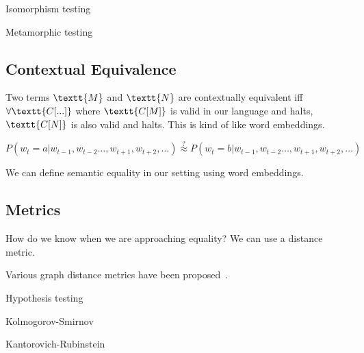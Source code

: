 \documentclass[11pt]{article}
\begin{document}
    Isomorphism testing

    Metamorphic testing

    \subsection{Contextual Equivalence}


    Two terms $\textt{M}$ and $\textt{N}$ are contextually equivalent iff $\forall \textt{C[...]}$ where $\textt{C[M]}$ is valid in our language and halts, $\textt{C[N]}$ is also valid and halts. This is kind of like word embeddings.

    $P(w_t = a | w_{t-1}, w_{t-2}\ldots, w_{t+1}, w_{t+2}, \ldots)\overset{?}{\approx} P(w_t = b | w_{t-1}, w_{t-2}\ldots, w_{t+1}, w_{t+2}, \ldots)$

    We can define semantic equality in our setting using word embeddings.

%
%

    \subsection{Metrics}\label{sec:probabilistic}

    How do we know when we are approaching equality? We can use a distance metric.


    Various graph distance metrics have been proposed~\citet{sanfeliu1983distance}.

    Hypothesis testing

    Kolmogorov-Smirnov

    Kantorovich-Rubinstein
\end{document}
